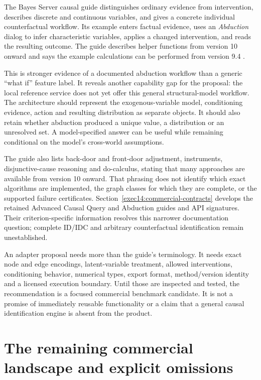 The Bayes Server causal guide distinguishes ordinary evidence from intervention,
describes discrete and continuous variables, and gives a concrete individual
counterfactual workflow. Its example enters factual evidence, uses an
\emph{Abduction} dialog to infer characteristic variables, applies a changed
intervention, and reads the resulting outcome. The guide describes helper
functions from version 10 onward and says the example calculations can be
performed from version 9.4 \citep{exec13_ci_bayesserver_causality}.

This is stronger evidence of a documented abduction workflow than a generic
``what if'' feature label. It reveals another capability gap for the proposal:
the local reference service does not yet offer this general structural-model
workflow. The architecture should represent the exogenous-variable model,
conditioning evidence, action and resulting distribution as separate objects.
It should also retain whether abduction produced a unique value, a distribution
or an unresolved set. A model-specified answer can be useful while remaining
conditional on the model's cross-world assumptions.

The guide also lists back-door and front-door adjustment, instruments,
disjunctive-cause reasoning and do-calculus, stating that many approaches are
available from version 10 onward. That phrasing does not identify which exact
algorithms are implemented, the graph classes for which they are complete, or
the supported failure certificates. Section~\ref{exec14:commercial-contracts} develops the retained Advanced
Causal Query and Abduction guides and API signatures. Their criterion-specific
information resolves this narrower documentation question; complete ID/IDC
and arbitrary counterfactual identification remain unestablished.

An adapter proposal needs more than the guide's terminology. It needs exact
node and edge encodings, latent-variable treatment, allowed interventions,
conditioning behavior, numerical types, export format, method/version identity
and a licensed execution boundary. Until those are inspected and tested, the
recommendation is a focused commercial benchmark candidate. It is not a promise
of immediately reusable functionality or a claim that a general causal
identification engine is absent from the product.

\section{The remaining commercial landscape and explicit omissions}

